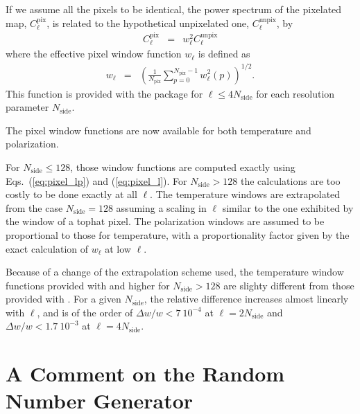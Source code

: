 \documentclass[12pt,twoside]{article}
\newcommand{\myhtmlimage}[1]{ }
\newcommand{\npix}{N_{\mathrm{pix}}}
\newcommand{\nside}{N_{\mathrm{side}}}
\begin{document}
If we assume all the pixels to be identical, the power spectrum of the
pixelated map, $C_{\ell}^{\mathrm{pix}}$, is related to the hypothetical unpixelated
one, $C_{\ell}^{\mathrm{unpix}}$, by 
\begin{eqnarray}
	C_{\ell}^\mathrm{pix} &=& w^2_{\ell} C_{\ell}^\mathrm{unpix} \myhtmlimage{}
	\label{eq:cl_pixel} 
\end{eqnarray}
where the effective pixel window function $w_{\ell}$ is defined as
\begin{eqnarray}
	w_{\ell} &=& \left(\frac{1}{\npix}\sum_{p=0}^{\npix-1} w^2_{\ell}(p)\right)^{1/2}.\myhtmlimage{}
	\label{eq:pixel_l} 
\end{eqnarray}
This function is provided with the \healpix package for $\ell\le 4\nside$ for each
resolution parameter $\nside$.

The pixel window functions are now available for both temperature and
polarization.

For $\nside \le 128$, those window functions are computed exactly using
Eqs.~(\ref{eq:pixel_lp}) and (\ref{eq:pixel_l}). For $\nside > 128$ the
calculations are too costly to be done exactly at all $\ell$. The temperature
windows are
extrapolated from the case $\nside = 128$ assuming a scaling in $\ell$ similar
to the one exhibited by the window of a tophat pixel. The polarization
windows are assumed to be proportional to those for temperature, with a
proportionality factor given by the exact calculation of $w_{\ell}$ at low
$\ell$.

Because of a change of the extrapolation scheme used, the temperature window
functions provided with  and higher for $\nside > 128$ are slighty different from those
provided with . For a given $\nside$, the relative difference
increases almost linearly with $\ell$, and is of the order of $\Delta w/w < 7\ 10^{-4}$ at
$\ell=2\nside$ and $\Delta w/w < 1.7\ 10^{-3}$ at $\ell=4\nside$.



\section{A Comment on the Random Number Generator}
\end{document}
